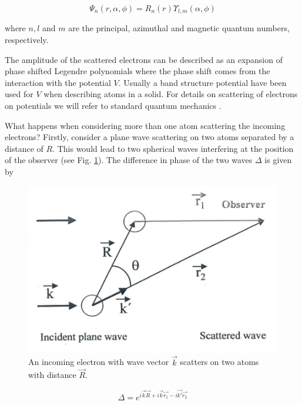 \begin{equation}
\Psi_n(r,\alpha,\phi)=R_n(r)\Upsilon_{l,m}(\alpha,\phi) 
\end{equation}

\noindent where $n, l$ and $m$ are the principal, azimuthal and magnetic quantum numbers, respectively.

The amplitude of the scattered electrons can  be described as an expansion of phase shifted Legendre polynomials where the phase shift comes from the interaction with the potential $V$. Usually a band structure potential have been used for $V$ when describing atoms in a solid. For details on scattering of electrons on potentials we will refer to standard quantum mechanics \cite{Shiff,Merzbacher}.

What happens when considering more than one  atom scattering the incoming electrons? Firstly, consider a plane wave scattering on two atoms separated by a distance of $R$. This would lead to two spherical waves interfering at the position of the observer (see Fig. \ref{fig:electronscatter}). The difference in phase of the two waves $\Delta$ is given by

\begin{figure}[h!]
	\begin{center}
	\includegraphics[scale=2]{figures/09_08.png}
	\caption{An incoming electron with wave vector $\vec{k}$ scatters on two atoms with distance $\vec{R}$.}
	\label{fig:electronscatter}
	\end{center}
\end{figure}

\begin{equation}
\Delta=e^{i\vec{k} \vec{R}+i\vec{k} \vec{r_1}-i\vec{k'}\vec{r_2}} 
\end{equation}

